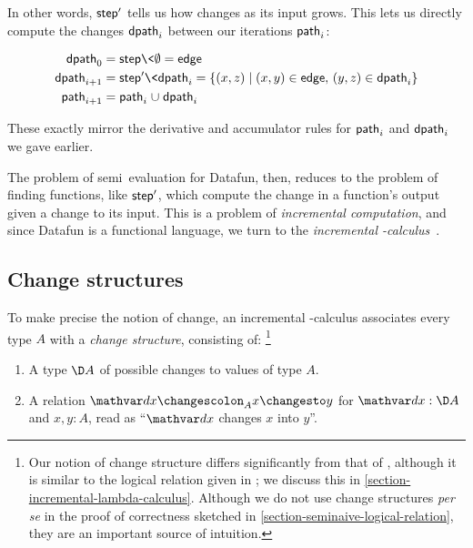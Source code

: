 \noindent
In other words, $\text{\sffamily step}'$ tells us how  changes as its input
grows.
%
This lets us directly compute the changes $\text{\sffamily dpath}_i$ between our
iterations $\text{\sffamily path}_i$:

\begin{align*}
  \name{dpath}_0
  &= \name{step}\<\emptyset
  = \name{edge}
  \\
  \name{dpath}_{i+1}
  &= \name{step}'\<\name{dpath}_i
  = \setfor{(x,z)}{(x,y) \in \name{edge},\, (y,z) \in \name{dpath}_i}
  \\
  \name{path}_{i+1}
  &= \name{path}_i \cup \name{dpath}_i
\end{align*}

\noindent These exactly mirror the derivative and accumulator rules for
\(\text{\sffamily path}_i\) and \(\text{\sffamily dpath}_i\) we gave earlier.

The problem of semi\naive\ evaluation for Datafun, then, reduces to the problem
of finding functions, like $\text{\sffamily step}'$, which compute the change in a
function's output given a change to its input.
%
This is a problem of \emph{incremental computation}, and since Datafun is a
functional language, we turn to the \emph{incremental
  \fn-calculus}~\citep{incremental,DBLP:conf/esop/GiarrussoRS19,DBLP:phd/dnb/Giarrusso20}.


\subsection{Change structures}
\label{section-change-structures}

To make precise the notion of change, an incremental \fn-calculus associates
every type $A$ with a \emph{change structure}, consisting of:%
%
\footnote{Our notion of change structure differs significantly from that of
  \citet{incremental}, although it is similar to the logical relation given in
  \citet{DBLP:conf/esop/GiarrussoRS19}; we discuss this in
    \cref{section-incremental-lambda-calculus}. Although we do not use change
  structures \emph{per se} in the proof of correctness sketched in
  \cref{section-seminaive-logical-relation}, they are an important source of
  intuition.}

\begin{enumerate}
\item A type $\D A$ of possible changes to values of type $A$.
\item A relation $\changesat{A}{\dx}{x}{y}$ for $\dx : \D A$ and $x,y : A$,
  read as ``$\dx$ changes $x$ into $y$''.
\end{enumerate}

